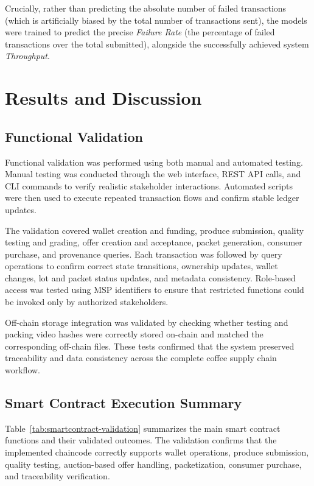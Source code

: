 \documentclass[12pt]{article}
\begin{document}
Crucially, rather than predicting the absolute number of failed transactions (which is artificially biased by the total number of transactions sent), the models were trained to predict the precise \textit{Failure Rate} (the percentage of failed transactions over the total submitted), alongside the successfully achieved system \textit{Throughput}.

\section{Results and Discussion}
\subsection{Functional Validation}

Functional validation was performed using both manual and automated testing. Manual testing was conducted through the web interface, REST API calls, and CLI commands to verify realistic stakeholder interactions. Automated scripts were then used to execute repeated transaction flows and confirm stable ledger updates.

The validation covered wallet creation and funding, produce submission, quality testing and grading, offer creation and acceptance, packet generation, consumer purchase, and provenance queries. Each transaction was followed by query operations to confirm correct state transitions, ownership updates, wallet changes, lot and packet status updates, and metadata consistency. Role-based access was tested using MSP identifiers to ensure that restricted functions could be invoked only by authorized stakeholders.

Off-chain storage integration was validated by checking whether testing and packing video hashes were correctly stored on-chain and matched the corresponding off-chain files. These tests confirmed that the system preserved traceability and data consistency across the complete coffee supply chain workflow.

\subsection{Smart Contract Execution Summary}

Table~\ref{tab:smartcontract-validation} summarizes the main smart contract functions and their validated outcomes. The validation confirms that the implemented chaincode correctly supports wallet operations, produce submission, quality testing, auction-based offer handling, packetization, consumer purchase, and traceability verification.
	
\end{document}
